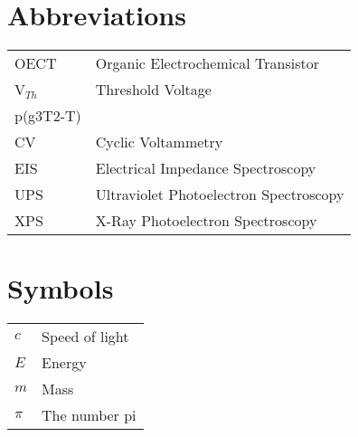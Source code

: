\documentclass[master=emnan,masteroption=ne]{kulemt}
\begin{document}
\section*{Abbreviations}
\begin{flushleft}
  \renewcommand{\arraystretch}{1.1}
  \begin{tabularx}{\textwidth}{@{}p{12mm}X@{}}
    OECT   & Organic Electrochemical Transistor \\
    V$_{Th}$   & Threshold Voltage \\
	p(g3T2-T) &     \\
    CV  & Cyclic Voltammetry \\
    EIS  & Electrical Impedance Spectroscopy \\
    UPS  & Ultraviolet Photoelectron Spectroscopy \\
    XPS  & X-Ray Photoelectron Spectroscopy \\  \end{tabularx}
\end{flushleft}
\section*{Symbols}
\begin{flushleft}
  \renewcommand{\arraystretch}{1.1}
  \begin{tabularx}{\textwidth}{@{}p{15mm}X@{}}
    $c$   & Speed of light \\
    $E$   & Energy \\
    $m$   & Mass \\
    $\pi$ & The number pi \\
  \end{tabularx}
\end{flushleft}

\mainmatter




%



\appendix


%

\backmatter

%

\end{document}
